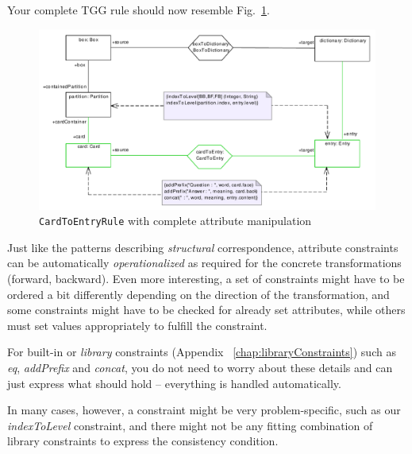 Your complete TGG rule should now resemble Fig.~\ref{fig:cardtoentry_complete}.
\begin{figure}[htbp]
\begin{center}
  \includegraphics[width=\textwidth]{pics/tggBilder/tggRule/tgg21}
  \caption{\texttt{CardToEntryRule} with complete attribute manipulation}  
  \label{fig:cardtoentry_complete}
\end{center}
\end{figure}

Just like the patterns describing \emph{structural} correspondence,  attribute constraints can be automatically \emph{operationalized} as required for the concrete transformations (forward, backward).
Even more interesting, a set of constraints might have to be ordered a bit differently depending on the direction of the transformation, and some constraints might have to be checked for already set attributes, while others must set values appropriately to fulfill the constraint.

For built-in or \emph{library} constraints (Appendix
~\ref{chap:libraryConstraints}) such as \emph{eq}, \emph{addPrefix} and
\emph{concat}, you do not need to worry about these details and can just express what should hold -- everything is handled automatically.

In many cases, however, a constraint might be very problem-specific, such as our \emph{indexToLevel} constraint, and there might not be any fitting combination of library constraints to express the consistency condition.

